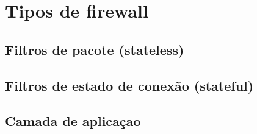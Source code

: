 \section{Tipos de firewall}

\subsection{Filtros de pacote (stateless)}

\subsection{Filtros de estado de conexão (stateful)}

\subsection{Camada de aplicaçao}


